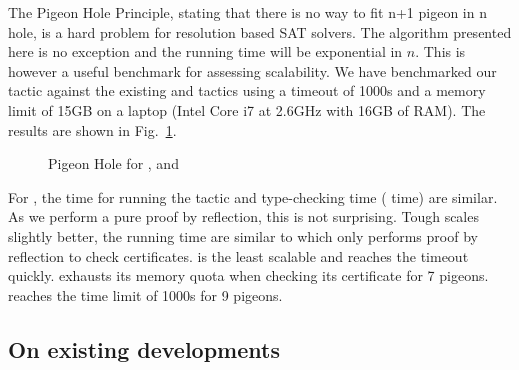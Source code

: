 \documentclass[utf8,a4paper,UKenglish,cleveref, autoref, thm-restate]{lipics-v2019}
\begin{document}
The Pigeon Hole Principle, stating that there is no way to fit n+1
pigeon in n hole, is a hard problem for resolution based SAT solvers.
%
The algorithm presented here is no exception and the running time will
be exponential in $n$. This is however a useful benchmark for
assessing scalability. We have benchmarked our  tactic
against the existing  and  tactics using a
timeout of 1000s and a memory limit of 15GB on a laptop (Intel Core i7
at 2.6GHz with 16GB of RAM).
%
The results are shown in Fig.~\ref{fig:pigeon}.
\begin{figure}
  \centering
  \qquad
  \caption{Pigeon Hole for ,  and }
  \label{fig:pigeon}
\end{figure}
For , the time for running the tactic and type-checking
time ( time) are similar.  As we perform a pure proof by
reflection, this is not surprising.  Tough  scales
slightly better, the running time are similar to  which
only performs proof by reflection to check certificates.
%
 is the least scalable and reaches the timeout quickly.
%
 exhausts its memory quota when checking its certificate for 7 pigeons.
 reaches the time limit of 1000s for 9 pigeons.

\subsection{On existing developments}
\end{document}
